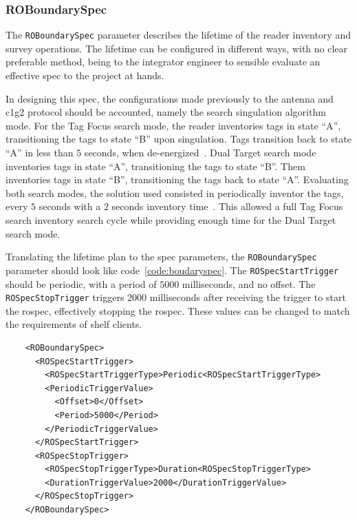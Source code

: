 \subsubsection{ROBoundarySpec}

The \texttt{ROBoundarySpec} parameter describes the lifetime of the reader inventory and survey operations.
The lifetime can be configured in different ways, with no clear preferable method, being to the integrator engineer to sensible evaluate an effective \ac{spec} to the project at hands.

In designing this \ac{spec}, the configurations made previously to the antenna and \ac{c1g2} protocol should be accounted, namely the search singulation algorithm mode.
For the Tag Focus search mode, the reader inventories tags in state ``A'', transitioning the tags to state ``B'' upon singulation. Tags transition back to state ``A'' in less than $5$ seconds, when de-energized~\cite{ImpinjOctaneLLRP}.
Dual Target search mode inventories tags in state ``A'', transitioning the tags to state ``B''. Them inventories tags in state ``B'', transitioning the tags back to state ``A''.
Evaluating both search modes, the solution used consisted in periodically inventor the tags, every $5$ seconds with a $2$ seconds inventory time~\cite{ImpinjOctaneLLRP, UnderstandingEPCGen2}.
This allowed a full Tag Focus search inventory search cycle while providing enough time for the Dual Target search mode.

Translating the lifetime plan to the \ac{spec} parameters, the \texttt{ROBoundarySpec} parameter should look like code~\ref{code:boudaryspec}. The \texttt{ROSpecStartTrigger} should be periodic, with a period of $5000$ milliseconds, and no offset. The \texttt{ROSpecStopTrigger} triggers $2000$ milliseconds after receiving the trigger to start the \ac{rospec}, effectively stopping the \ac{rospec}.
These values can be changed to match the requirements of shelf clients.

\begin{listing}
    \begin{verbatim}
    <ROBoundarySpec>
      <ROSpecStartTrigger>
        <ROSpecStartTriggerType>Periodic<ROSpecStartTriggerType>
        <PeriodicTriggerValue>
          <Offset>0</Offset>
          <Period>5000</Period>
        </PeriodicTriggerValue>
      </ROSpecStartTrigger>
      <ROSpecStopTrigger>
        <ROSpecStopTriggerType>Duration<ROSpecStopTriggerType>
        <DurationTriggerValue>2000</DurationTriggerValue>
      </ROSpecStopTrigger>
    </ROBoundarySpec>
    \end{verbatim}
    \caption{}
    \label{code:boudaryspec}
\end{listing}

